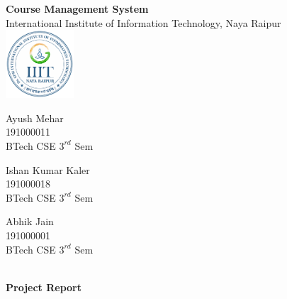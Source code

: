 \documentclass[12pt, a4paper]{article}
\begin{document}
\thispagestyle{empty}

\begin{center}
	{\vspace*{3cm}}
	\textbf{\Huge{Course Management System}}\\
	{\vspace{2em}}
	{\large International Institute of Information Technology, Naya Raipur}\\
	{\vspace{2em}}
	{\includegraphics[width=1in]{download.png}} \\
	{\vspace{3em}}
	\begin{minipage}{0.3\textwidth}
		\begin{center}
			Ayush Mehar \\
			191000011 \\
			BTech CSE $3^{rd}$ Sem \\
		\end{center}
	\end{minipage}
	\begin{minipage}{0.3\textwidth}
		\begin{center}
			Ishan Kumar Kaler \\
			191000018 \\
			BTech CSE $3^{rd}$ Sem \\
		\end{center}
	\end{minipage}
	\begin{minipage}{0.3\textwidth}
		\begin{center}
			Abhik Jain \\
			191000001 \\
			BTech CSE $3^{rd}$ Sem \\
		\end{center}
	\end{minipage}
	\\
	{\vspace{3cm}}
    {\Large \textbf{Project Report}}
\end{center}

\newpage

\tableofcontents

\newpage

\end{document}
